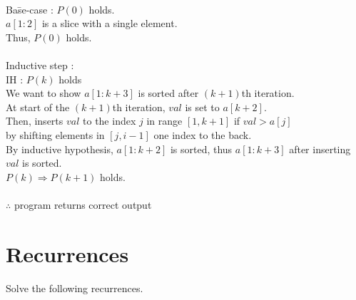 \documentclass[solutionorbox,answers]{exam}
\begin{document}
\begin{questions}
\begin{parts}
\begin{solutionbox}{5.9in}
\begin{tabbing}
    \\
    \> Ba\=se-case : $P(0)$ holds.\\
    \>\> $a[1:2]$ is a slice with a single element.\\
    \>\> Thus, $P(0)$ holds.\\
    \\
    \> Inductive step :\\
    \>\> IH : $P(k)$ holds\\
    \>\> We want to show $a[1:k+3]$ is sorted after $(k+1)$th iteration.\\
    \>\> At start of the $(k+1)$th iteration, $val$ is set to $a[k+2]$.\\
    \>\> Then, inserts $val$ to the index $j$ in range $[1, k+1]$ if $val > a[j]$\\
    \>\> by shifting elements in $[j, i-1]$ one index to the back.\\
    \>\> By inductive hypothesis, $a[1:k+2]$ is sorted, thus $a[1:k+3]$ after inserting $val$ is sorted.\\
    \>\> $P(k) \Rightarrow P(k+1)$ holds.\\
    \\
    \> $\therefore$ program returns correct output\\
  \end{tabbing}
  \end{solutionbox}
  
\end{parts}
\section*{Recurrences}
\label{sec:recurrences}

\question
Solve the following recurrences.

\end{questions}
\end{document}
